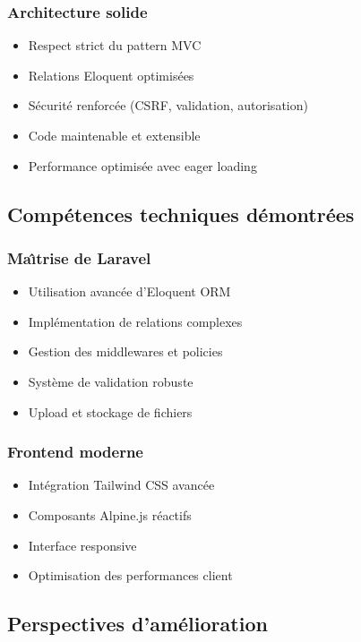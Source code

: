 \documentclass[12pt,a4paper]{article}
\begin{document}
\subsubsection{Architecture solide}
\begin{itemize}
    \item Respect strict du pattern MVC
    \item Relations Eloquent optimis\'ees
    \item S\'ecurit\'e renforc\'ee (CSRF, validation, autorisation)
    \item Code maintenable et extensible
    \item Performance optimis\'ee avec eager loading
\end{itemize}

\subsection{Comp\'etences techniques d\'emontr\'ees}

\subsubsection{Ma\^{\i}trise de Laravel}
\begin{itemize}
    \item Utilisation avanc\'ee d'Eloquent ORM
    \item Impl\'ementation de relations complexes
    \item Gestion des middlewares et policies
    \item Syst\`eme de validation robuste
    \item Upload et stockage de fichiers
\end{itemize}

\subsubsection{Frontend moderne}
\begin{itemize}
    \item Int\'egration Tailwind CSS avanc\'ee
    \item Composants Alpine.js r\'eactifs
    \item Interface responsive
    \item Optimisation des performances client
\end{itemize}

\subsection{Perspectives d'am\'elioration}
\end{document}
